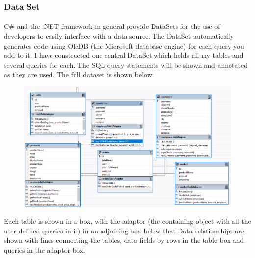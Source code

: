 ﻿\documentclass{article}
\begin{document}
    \subsubsection{Data Set}
    \paragraph{}
    C\# and the .NET framework in general provide DataSets for the use of developers to easily interface with a data source.
    The DataSet automatically generates code using OleDB (the Microsoft database engine) for each query you add to it.
    I have constructed one central DataSet which holds all my tables and several queries for each.
    The SQL query statements will be shown and annotated as they are used.
    The full dataset is shown below:
    \begin{figure}[h]
        \centering
        \includegraphics[width=\textwidth]{defaultDataSet.png}
    \end{figure}
    Each table is shown in a box, with the adaptor (the containing object with all the user-defined queries in it) in an adjoining box below that
    Data relationships are shown with lines connecting the tables, data fields by rows in the table box and queries in the adaptor box.
    \newpage
\end{document}
